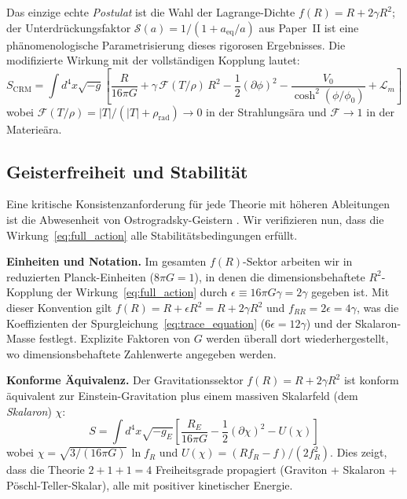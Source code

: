 \documentclass[11pt,a4paper]{article}
\begin{document}
Das einzige echte \textit{Postulat} ist die Wahl der Lagrange-Dichte $f(R) = R + 2\gamma R^2$; der Unterdr\"uckungsfaktor $\mathcal{S}(a) = 1/(1 + a_{\mathrm{eq}}/a)$ aus Paper~II ist eine ph\"anomenologische Parametrisierung dieses rigorosen Ergebnisses. Die modifizierte Wirkung mit der vollst\"andigen Kopplung lautet:
\begin{equation}
S_{\mathrm{CRM}} = \int d^4x \sqrt{-g} \left[\frac{R}{16\pi G} + \gamma\, \mathcal{F}(T/\rho)\, R^2 - \frac{1}{2}(\partial\phi)^2 - \frac{V_0}{\cosh^2(\phi/\phi_0)} + \mathcal{L}_m\right]
\end{equation}
wobei $\mathcal{F}(T/\rho) = |T|/(|T| + \rho_{\mathrm{rad}}) \to 0$ in der Strahlungs\"ara und $\mathcal{F} \to 1$ in der Materie\"ara.

\subsection{Geisterfreiheit und Stabilit\"at}
\label{subsec:ghost_analysis}

Eine kritische Konsistenzanforderung f\"ur jede Theorie mit h\"oheren Ableitungen ist die Abwesenheit von Ostrogradsky-Geistern \cite{Woodard2015}. Wir verifizieren nun, dass die Wirkung~\eqref{eq:full_action} alle Stabilit\"atsbedingungen erf\"ullt.

\textbf{Einheiten und Notation.} Im gesamten $f(R)$-Sektor arbeiten wir in reduzierten Planck-Einheiten ($8\pi G = 1$), in denen die dimensionsbehaftete $R^2$-Kopplung der Wirkung~\eqref{eq:full_action} durch $\epsilon \equiv 16\pi G\gamma = 2\gamma$ gegeben ist. Mit dieser Konvention gilt $f(R) = R + \epsilon R^2 = R + 2\gamma R^2$ und $f_{RR} = 2\epsilon = 4\gamma$, was die Koeffizienten der Spurgleichung~\eqref{eq:trace_equation} ($6\epsilon = 12\gamma$) und der Skalaron-Masse festlegt. Explizite Faktoren von $G$ werden \"uberall dort wiederhergestellt, wo dimensionsbehaftete Zahlenwerte angegeben werden.

\textbf{Konforme \"Aquivalenz.} Der Gravitationssektor $f(R) = R + 2\gamma R^2$ ist konform \"aquivalent zur Einstein-Gravitation plus einem massiven Skalarfeld (dem \textit{Skalaron}) $\chi$:
\begin{equation}
S = \int d^4x \sqrt{-g_E} \left[\frac{R_E}{16\pi G} - \frac{1}{2}(\partial\chi)^2 - U(\chi) \right]
\end{equation}
wobei $\chi = \sqrt{3/(16\pi G)}\,\ln f_R$ und $U(\chi) = (R f_R - f)/(2 f_R^2)$. Dies zeigt, dass die Theorie $2 + 1 + 1 = 4$ Freiheitsgrade propagiert (Graviton + Skalaron + P\"oschl-Teller-Skalar), alle mit positiver kinetischer Energie.
\end{document}

